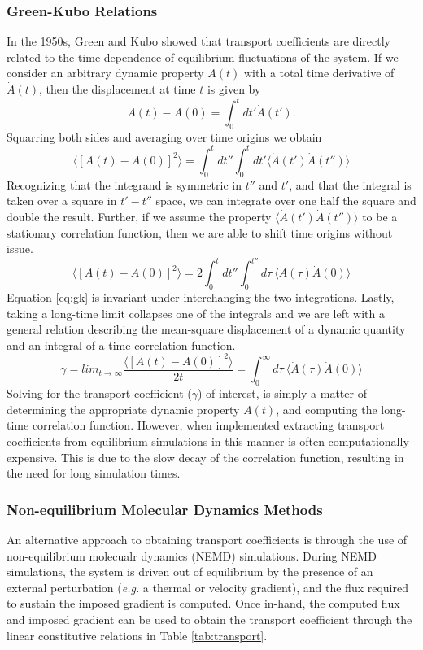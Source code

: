 \subsubsection{Green-Kubo Relations}
In the 1950s, Green and Kubo showed that transport coefficients are
directly related to the time dependence of equilibrium fluctuations of
the system.\cite{Green1954,Kubo1957} If we consider an arbitrary
dynamic property $A(t)$ with a total time derivative of $\dot{A}(t)$,
then the displacement at time $t$ is given by
\begin{equation}
A(t) - A(0) = \int_0^t dt' \dot{A}(t').
\end{equation}
Squarring both sides and averaging over time origins we obtain 
\begin{equation}
\langle [A(t) - A(0)]^2 \rangle = \int_0^t dt'' \int_0^t dt' \langle
\dot{A}(t') \dot{A}(t'') \rangle
\end{equation}
Recognizing that the integrand is symmetric in $t''$ and $t'$, and
that the integral is taken over a square in $t'-t''$ space, we can
integrate over one half the square and double the result. Further, if
we assume the property $\langle \dot{A}(t') \dot{A}(t'') \rangle$ to
be a stationary correlation function, then we are able to shift time
origins without issue. 
\begin{equation}\label{eq:gk}
  \langle [A(t) - A(0)]^2 \rangle = 2 \int_0^t dt'' \int_0^{t''} d\tau ~
  \langle \dot{A}(\tau ) \dot{A}(0) \rangle
\end{equation}
Equation \ref{eq:gk} is invariant under interchanging the two
integrations. Lastly, taking a long-time limit collapses one of the
integrals and we are left with a general relation describing the
mean-square displacement of a dynamic quantity and an integral of a
time correlation function.
\begin{equation}\label{eq:gk2}
 \gamma =  lim_{t \rightarrow \infty} \frac{\langle[ A(t) - A(0)]^2 \rangle}{2t} =
  \int_0^{\infty} d\tau ~ \langle \dot{A}(\tau ) \dot{A}(0) \rangle
\end{equation}
Solving for the transport coefficient ($\gamma$) of interest, is
simply a matter of determining the appropriate dynamic property
$A(t)$, and computing the long-time correlation function. However,
when implemented extracting transport coefficients from equilibrium
simulations in this manner is often computationally expensive. This is
due to the slow decay of the correlation function, resulting in the
need for long simulation times.

\subsubsection{Non-equilibrium Molecular Dynamics Methods}
An alternative approach to obtaining transport coefficients is through
the use of non-equilibrium molecualr dynamics (NEMD) simulations.
During NEMD simulations, the system is driven out of equilibrium by
the presence of an external perturbation (\textit{e.g.} a thermal or
velocity gradient), and the flux required to sustain the imposed
gradient is computed. Once in-hand, the computed flux and imposed
gradient can be used to obtain the transport coefficient through the
linear constitutive relations in Table \ref{tab:transport}.

